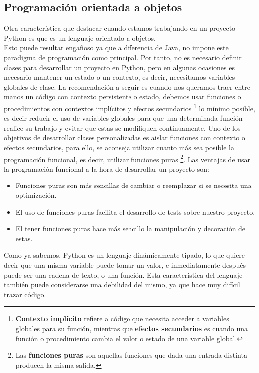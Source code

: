 \subsection*{Programación orientada a objetos}
Otra característica que destacar cuando estamos trabajando en un proyecto Python es que es un lenguaje orientado a objetos. \\
Esto puede resultar engañoso ya que a diferencia de Java, no impone este paradigma de programación como principal. Por tanto, no es necesario definir clases para desarrollar un proyecto en Python, pero en algunas ocasiones es necesario mantener un estado o un contexto, es decir, necesitamos variables globales de clase. La recomendación a seguir es cuando nos queramos traer entre manos un código con contexto persistente o estado, debemos usar funciones o procedimientos con contextos implícitos y efectos secundarios \footnote{\textbf{Contexto implícito} refiere a código que necesita acceder a variables globales para su función, mientras que \textbf{efectos secundarios} es cuando una función o procedimiento cambia el valor  o estado de una variable global. } lo mínimo posible, es decir reducir el uso de variables globales para que una determinada función realice su trabajo y evitar que estas se modifiquen continuamente. Uno de los objetivos de desarrollar clases personalizadas es aislar funciones con contexto o efectos secundarios, para ello, se aconseja utilizar cuanto más sea posible la programación funcional, es decir, utilizar funciones puras \footnote{Las \textbf{funciones puras} son aquellas funciones que dada una entrada distinta producen la misma salida.}. Las ventajas de usar la programación funcional  a la hora de desarrollar un proyecto son:
\begin{itemize}
    \item Funciones puras son más sencillas de cambiar o reemplazar si se necesita una optimización.
    \item El uso de funciones puras facilita el desarrollo de tests sobre nuestro proyecto.
    \item El tener funciones puras hace más sencillo la manipulación y decoración de estas.
\end{itemize}
Como ya sabemos, Python es un lenguaje dinámicamente tipado, lo que quiere decir que una misma variable puede tomar un valor, e inmediatamente después puede ser una cadena de texto, o una función. Esta característica del lenguaje también puede considerarse una debilidad del mismo, ya que hace muy difícil trazar código.\\

